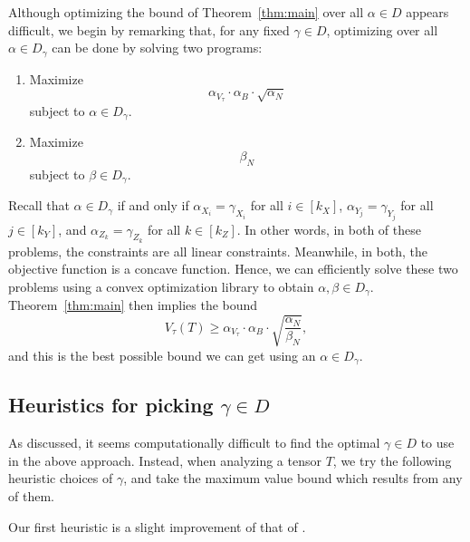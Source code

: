 \PassOptionsToPackage{shortlabels}{enumitem}\documentclass[10pt,a4paper]{article}
\begin{document}
Although optimizing the bound of Theorem~\ref{thm:main} over all $\alpha \in D$ appears difficult, we begin by remarking that, for any fixed $\gamma \in D$, optimizing over all $\alpha \in D_\gamma$ can be done by solving two programs:

\begin{enumerate}[label={\lsstyle\interextrabold\fontsize{12}{12}\selectfont PROBLEM \arabic*.},  align= left, itemsep=1em, labelindent = 0em,ref=\arabic*] 
    \item \label{prob1} Maximize $$\alpha_{V_\tau} \cdot \alpha_B \cdot \sqrt{\alpha_N}$$ subject to $\alpha \in D_\gamma$.
    \item \label{prob2} Maximize $$\beta_N$$ subject to $\beta \in D_\gamma$.
\end{enumerate}

 






Recall that $\alpha \in D_\gamma$ if and only if $\alpha_{X_i} = \gamma_{X_i}$ for all $i \in [k_X]$, $\alpha_{Y_j} = \gamma_{Y_j}$ for all $j \in [k_Y]$, and $\alpha_{Z_k} = \gamma_{Z_k}$ for all $k \in [k_Z]$. In other words, in both of these problems, the constraints are all linear constraints. Meanwhile, in both, the objective function is a concave function. Hence, we can efficiently solve these two problems using a convex optimization library to obtain $\alpha, \beta \in D_\gamma$. Theorem~\ref{thm:main} then implies the bound $$V_\tau(T) \geq \alpha_{V_\tau} \cdot \alpha_B \cdot \sqrt{\frac{\alpha_N}{\beta_N}},$$
and this is the best possible bound we can get using an $\alpha \in D_\gamma$.

\subsection{Heuristics for picking \texorpdfstring{$\gamma \in D$}{gamma in D}} \label{subsec:heuristics}

As discussed, it seems computationally difficult to find the optimal $\gamma \in D$ to use in the above approach. Instead, when analyzing a tensor $T$, we try the following heuristic choices of $\gamma$, and take the maximum value bound which results from any of them. 


Our first heuristic is a slight improvement of that of \cite[{Algorithm~B}]{legall}.
\end{document}
